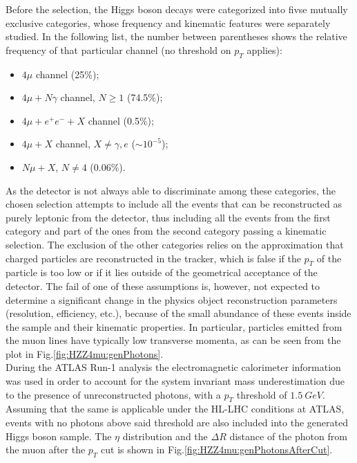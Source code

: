 \documentclass[a4paper,twoside,12pt]{article}
\begin{document}
Before the selection, the Higgs boson decays were categorized into fivse 
mutually exclusive categories, whose frequency and kinematic features were separately 
studied. In the following list, the number between parentheses shows the relative frequency
of that particular channel (no threshold on $p_{T}$ applies):

\begin{itemize}
\item $4\mu$ channel (25\%);
\item $4\mu + N\gamma$ channel, $N \geq 1$ (74.5\%);
\item $4\mu + e^+e^- + X$ channel (0.5\%);
\item $4\mu + X$ channel, $X \neq \gamma, e$ ($\sim 10^{-5}$);
\item $N\mu + X$, $N \neq 4$ (0.06\%).
\end{itemize}

As the detector is not always able to discriminate among these categories, the chosen selection attempts to include all the events that can be reconstructed as purely leptonic from
the detector, thus including all the events
from the first category and part of the ones from the second category passing a kinematic 
selection. The exclusion of the other categories relies on the approximation that charged
particles are reconstructed in the tracker, which is false if the $p_{T}$ of the particle is 
too low or if it lies outside of the geometrical acceptance of the detector. The fail of one 
of these assumptions is, however, not expected to determine a significant change in the
physics object reconstruction parameters (resolution, efficiency, etc.), because of the
small abundance of these events inside the sample and their kinematic properties. 
In particular, particles emitted from the muon lines have typically low transverse momenta, as can be 
seen from the plot in Fig.\ref{fig:HZZ4mu:genPhotons}. \\

During the ATLAS Run-1 analysis the electromagnetic calorimeter information was used
in order to account for the system invariant mass underestimation due to the presence of
unreconstructed photons, with a $p_T$ threshold of $1.5\ GeV$\cite{HZZ4mu_run1}. Assuming that the same
is applicable under the HL-LHC conditions at ATLAS, events with no photons above said 
threshold are also included into the generated Higgs boson sample. The $\eta$ distribution
and the $\Delta R$ distance of the photon from the muon after the $p_T$ cut is shown in Fig.\ref{fig:HZZ4mu:genPhotonsAfterCut}.\\
\end{document}

